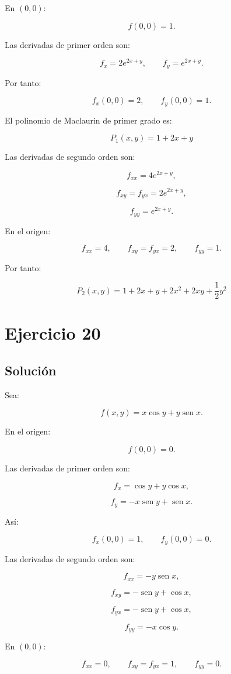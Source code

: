 \documentclass[11pt,a4paper]{article}
\newcommand{\sen}{\operatorname{sen}}
\begin{document}
En \((0,0)\):

\[
f(0,0)=1.
\]

Las derivadas de primer orden son:

\[
f_x=2e^{2x+y},
\qquad
f_y=e^{2x+y}.
\]

Por tanto:

\[
f_x(0,0)=2,
\qquad
f_y(0,0)=1.
\]

El polinomio de Maclaurin de primer grado es:

\[
\boxed{
P_1(x,y)
=
1+2x+y
}
\]

Las derivadas de segundo orden son:

\[
f_{xx}=4e^{2x+y},
\]

\[
f_{xy}=f_{yx}=2e^{2x+y},
\]

\[
f_{yy}=e^{2x+y}.
\]

En el origen:

\[
f_{xx}=4,
\qquad
f_{xy}=f_{yx}=2,
\qquad
f_{yy}=1.
\]

Por tanto:

\[
\boxed{
P_2(x,y)
=
1+2x+y
+
2x^2+2xy+\frac12y^2
}
\]

\section{Ejercicio 20}
\subsection{Solución}

Sea:

\[
f(x,y)
=
x\cos y+y\sen x.
\]

En el origen:

\[
f(0,0)=0.
\]

Las derivadas de primer orden son:

\[
f_x
=
\cos y+y\cos x,
\]

\[
f_y
=
-x\sen y+\sen x.
\]

Así:

\[
f_x(0,0)=1,
\qquad
f_y(0,0)=0.
\]

Las derivadas de segundo orden son:

\[
f_{xx}
=
-y\sen x,
\]

\[
f_{xy}
=
-\sen y+\cos x,
\]

\[
f_{yx}
=
-\sen y+\cos x,
\]

\[
f_{yy}
=
-x\cos y.
\]

En \((0,0)\):

\[
f_{xx}=0,
\qquad
f_{xy}=f_{yx}=1,
\qquad
f_{yy}=0.
\]
\end{document}
